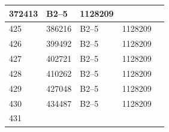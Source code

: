 \documentclass[UTF8,10pt,a4paper,fontset=fandol]{ctexart}
\newcommand{\fieldvalue}[1]{#1}
\begin{document}
\begin{center}
\begin{tabular}{|p{0.8cm}|p{2.2cm}|p{3.0cm}|p{3.0cm}|p{3.8cm}|}
\fieldvalue{372413} &
\fieldvalue{B2--5} &
\fieldvalue{1128209} & \\ \hline
\fieldvalue{425} &
\fieldvalue{386216} &
\fieldvalue{B2--5} &
\fieldvalue{1128209} & \\ \hline
\fieldvalue{426} &
\fieldvalue{399492} &
\fieldvalue{B2--5} &
\fieldvalue{1128209} & \\ \hline
\fieldvalue{427} &
\fieldvalue{402721} &
\fieldvalue{B2--5} &
\fieldvalue{1128209} & \\ \hline
\fieldvalue{428} &
\fieldvalue{410262} &
\fieldvalue{B2--5} &
\fieldvalue{1128209} & \\ \hline
\fieldvalue{429} &
\fieldvalue{427048} &
\fieldvalue{B2--5} &
\fieldvalue{1128209} & \\ \hline
\fieldvalue{430} &
\fieldvalue{434487} &
\fieldvalue{B2--5} &
\fieldvalue{1128209} & \\ \hline
\fieldvalue{431} &

\end{tabular}
\end{center}
\end{document}
